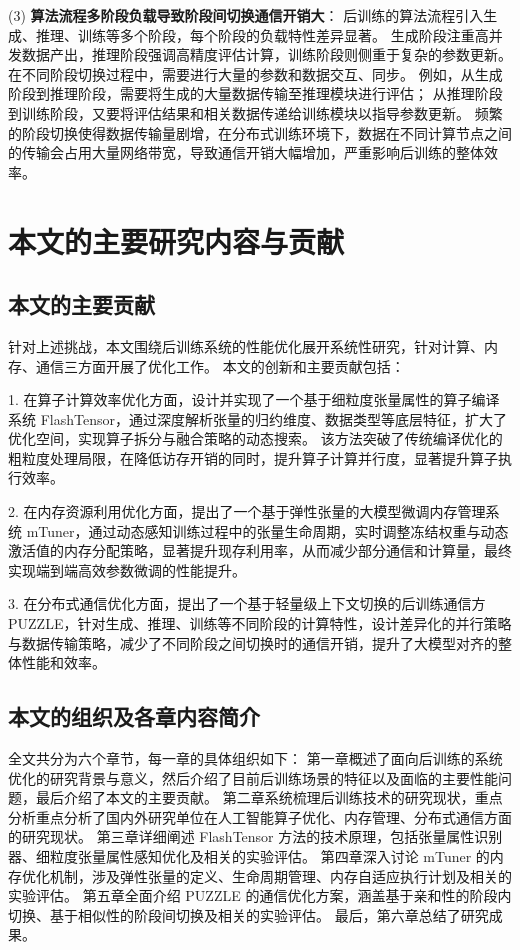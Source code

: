 (3) \textbf{算法流程多阶段负载导致阶段间切换通信开销大}：
后训练的算法流程引入生成、推理、训练等多个阶段，每个阶段的负载特性差异显著。
生成阶段注重高并发数据产出，推理阶段强调高精度评估计算，训练阶段则侧重于复杂的参数更新。
在不同阶段切换过程中，需要进行大量的参数和数据交互、同步。
例如，从生成阶段到推理阶段，需要将生成的大量数据传输至推理模块进行评估；
从推理阶段到训练阶段，又要将评估结果和相关数据传递给训练模块以指导参数更新。
频繁的阶段切换使得数据传输量剧增，在分布式训练环境下，数据在不同计算节点之间的传输会占用大量网络带宽，导致通信开销大幅增加，严重影响后训练的整体效率。


\section{本文的主要研究内容与贡献}

\subsection{本文的主要贡献}
针对上述挑战，本文围绕后训练系统的性能优化展开系统性研究，针对计算、内存、通信三方面开展了优化工作。
本文的创新和主要贡献包括：

1. 在算子计算效率优化方面，设计并实现了一个基于细粒度张量属性的算子编译系统 FlashTensor，通过深度解析张量的归约维度、数据类型等底层特征，扩大了优化空间，实现算子拆分与融合策略的动态搜索。
该方法突破了传统编译优化的粗粒度处理局限，在降低访存开销的同时，提升算子计算并行度，显著提升算子执行效率。

2. 在内存资源利用优化方面，提出了一个基于弹性张量的大模型微调内存管理系统 mTuner，通过动态感知训练过程中的张量生命周期，实时调整冻结权重与动态激活值的内存分配策略，显著提升现存利用率，从而减少部分通信和计算量，最终实现端到端高效参数微调的性能提升。

3. 在分布式通信优化方面，提出了一个基于轻量级上下文切换的后训练通信方 PUZZLE，针对生成、推理、训练等不同阶段的计算特性，设计差异化的并行策略与数据传输策略，减少了不同阶段之间切换时的通信开销，提升了大模型对齐的整体性能和效率。

\subsection{本文的组织及各章内容简介}
全文共分为六个章节，每一章的具体组织如下：
第一章概述了面向后训练的系统优化的研究背景与意义，然后介绍了目前后训练场景的特征以及面临的主要性能问题，最后介绍了本文的主要贡献。
第二章系统梳理后训练技术的研究现状，重点分析重点分析了国内外研究单位在人工智能算子优化、内存管理、分布式通信方面的研究现状。
第三章详细阐述 FlashTensor 方法的技术原理，包括张量属性识别器、细粒度张量属性感知优化及相关的实验评估。
第四章深入讨论 mTuner 的内存优化机制，涉及弹性张量的定义、生命周期管理、内存自适应执行计划及相关的实验评估。
第五章全面介绍 PUZZLE 的通信优化方案，涵盖基于亲和性的阶段内切换、基于相似性的阶段间切换及相关的实验评估。
最后，第六章总结了研究成果。